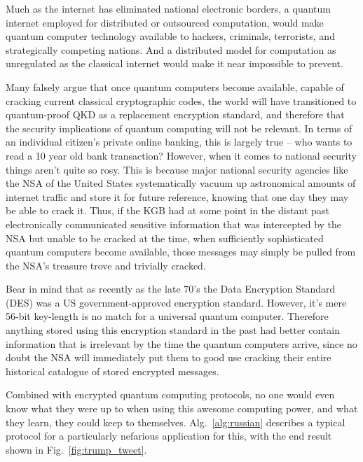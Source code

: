 Much as the internet has eliminated national electronic borders, a quantum internet employed for distributed or outsourced computation, would make quantum computer technology available to hackers, criminals, terrorists, and strategically competing nations. And a distributed model for computation as unregulated as the classical internet would make it near impossible to prevent.

Many falsely argue that once quantum computers become available, capable of cracking current classical cryptographic codes, the world will have transitioned to quantum-proof QKD as a replacement encryption standard, and therefore that the security implications of quantum computing will not be relevant. In terms of an individual citizen's private online banking, this is largely true -- who wants to read a 10 year old bank transaction? However, when it comes to national security things aren't quite so rosy. This is because major national security agencies like the NSA of the United States systematically vacuum up astronomical amounts of internet traffic and store it for future reference, knowing that one day they may be able to crack it. Thus, if the KGB had at some point in the distant past electronically communicated sensitive information that was intercepted by the NSA but unable to be cracked at the time, when sufficiently sophisticated quantum computers become available, those messages may simply be pulled from the NSA's treasure trove and trivially cracked.

Bear in mind that as recently as the late 70's the Data Encryption Standard (DES) was a US government-approved encryption standard. However, it's mere 56-bit key-length is no match for a universal quantum computer. Therefore anything stored using this encryption standard in the past had better contain information that is irrelevant by the time the quantum computers arrive, since no doubt the NSA will immediately put them to good use cracking their entire historical catalogue of stored encrypted messages.

Combined with encrypted quantum computing protocols, no one would even know what they were up to when using this awesome computing power, and what they learn, they could keep to themselves. Alg.~\ref{alg:russian} describes a typical protocol for a particularly nefarious application for this, with the end result shown in Fig.~\ref{fig:trump_tweet}.

